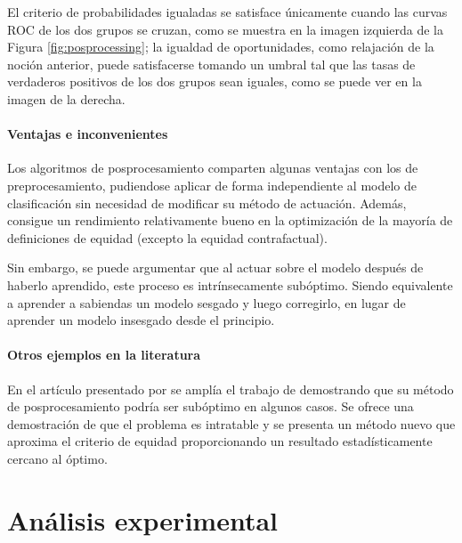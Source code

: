 \documentclass[oneside,openright,titlepage,numbers=noenddot,openany,headinclude,footinclude=true,
cleardoublepage=empty,abstractoff,BCOR=5mm,paper=a4,fontsize=12pt,main=spanish]{scrreprt}
\begin{document}
El criterio de probabilidades igualadas se satisface únicamente cuando las curvas ROC de los dos grupos se cruzan, como se muestra en la imagen izquierda de la Figura \ref{fig:posprocessing}; la igualdad de oportunidades, como relajación de la noción anterior, puede satisfacerse tomando un umbral tal que las tasas de verdaderos positivos de los dos grupos sean iguales, como se puede ver en la imagen de la derecha.

\subsection{Ventajas e inconvenientes}

Los algoritmos de posprocesamiento comparten algunas ventajas con los de preprocesamiento, pudiendose aplicar de forma independiente al modelo de clasificación sin necesidad de modificar su método de actuación. Además, consigue un rendimiento relativamente bueno en la optimización de la mayoría de definiciones de equidad (excepto la  equidad contrafactual).

Sin embargo, se puede argumentar que al actuar sobre el modelo después de haberlo aprendido, este proceso es intrínsecamente subóptimo. Siendo equivalente a aprender a sabiendas un modelo sesgado y luego corregirlo, en lugar de aprender un modelo insesgado desde el principio.

\subsection*{Otros ejemplos en la literatura}

En el artículo presentado por \cite{woodworth2017} se amplía el trabajo de \cite{eodd2016} demostrando que su método de posprocesamiento podría ser subóptimo en algunos casos. Se ofrece una demostración de que el problema es intratable y se presenta un método nuevo que aproxima el criterio de equidad proporcionando un resultado estadísticamente cercano al óptimo.

\part{Análisis experimental}  \label{part:analisis_exp}
\end{document}
